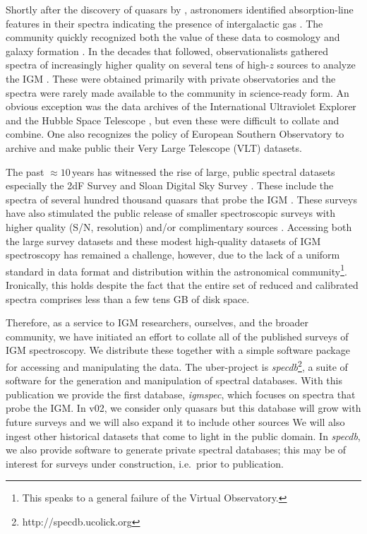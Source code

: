 \documentclass[12pt]{elsarticle}
\begin{document}
Shortly after the discovery of quasars by \cite{schmidt63},
astronomers identified absorption-line features in their 
spectra indicating the presence of intergalactic gas
\citep{bs65,blb66}.  
The community quickly recognized both the value of these
data to cosmology and galaxy formation \citep{gp65,bs69}.
In the decades that followed, observationalists gathered
spectra of increasingly higher quality on several tens of
high-$z$ sources to analyze the IGM 
\citep{sargent80,tytler82,wolfe86,lzt91}.
These were obtained primarily with private observatories and
the spectra were rarely made available
to the community in science-ready form.
An obvious exception was the data archives of the
International Ultraviolet Explorer
and the Hubble Space Telescope 
\citep[{\it HST};][]{hstkeyproj_1,bechtold02},
but even these were difficult to 
collate and combine.
One also recognizes the policy of European Southern
Observatory to archive and
make public their Very Large Telescope (VLT) datasets.

The past $\approx 10$\,years has witnessed the
rise of large, public spectral datasets especially
the 2dF Survey and Sloan Digital Sky Survey \citep[SDSS;][]{yaa+00,croom01}.
These include the spectra of several hundred thousand quasars
that probe the IGM \citep{sdss_qso_dr7,boss_dr12Q}.
These surveys have also stimulated the public release
of smaller spectroscopic surveys with higher quality
(S/N, resolution) and/or complimentary sources
\citep[e.g.][]{pwh+07,prochaska+15}.
Accessing both the large survey datasets 
and these modest high-quality datasets of IGM spectroscopy
has remained a challenge, however, due to the lack of a
uniform standard in data format and distribution within the astronomical
community\footnote{This speaks to a general failure of the
Virtual Observatory.}.
Ironically, this holds despite the fact that the entire set of
reduced and calibrated spectra 
comprises less than a few tens GB of disk space.

Therefore, as a service to IGM researchers, ourselves, and the
broader community, we have initiated an effort to collate 
all of the published surveys of IGM spectroscopy. We distribute
these together with a simple software package
for accessing and manipulating the data.  
The uber-project is {\it specdb}\footnote{http://specdb.ucolick.org},
a suite of software
for the generation and manipulation of spectral databases.
With this publication we provide the first database,
{\it igmspec}, which focuses on spectra that probe the IGM. 
In v02, we consider only quasars but 
this database will grow with future surveys 
and we will also expand it to include other sources
\citep[e.g. gamma-ray burst afterglow spectra, star-forming
galaxies, supernovae;][]{fjp+09,rpk+10,cooke+12}
We will also ingest other historical 
datasets that come to light in
the public domain.  
In {\it specdb}, we also provide 
software to generate private spectral databases; 
this may be of interest for surveys 
under construction, i.e.\ prior to publication.
\end{document}
